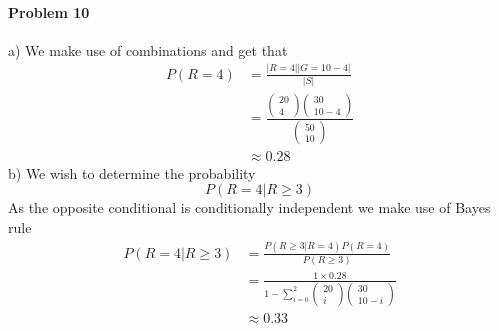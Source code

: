 \paragraph{Problem 10}
a)
We make use of combinations and get that
\begin{align*}
    P(R=4)&=\frac{|R=4||G=10-4|}{|S|} \\
          &=\frac{\begin{pmatrix}20\\4\end{pmatrix}\begin{pmatrix}30\\10-4\end{pmatrix}}{\begin{pmatrix}50\\10\end{pmatrix}} \\
          &\approx 0.28
\end{align*}
b)
We wish to determine the probability
\[
    P(R=4|R\geq3)
\]
As the opposite conditional is conditionally independent we make use of Bayes rule
\begin{align*}
    P(R=4|R\geq3)&=\frac{P(R\geq 3|R=4)P(R=4)}{P(R\geq 3)} \\
                 &=\frac{1\times 0.28}{1-\sum_{i=0}^{2}\begin{pmatrix}20\\i\end{pmatrix}\begin{pmatrix}30\\10-i\end{pmatrix}} \\
                 &\approx 0.33
\end{align*}
